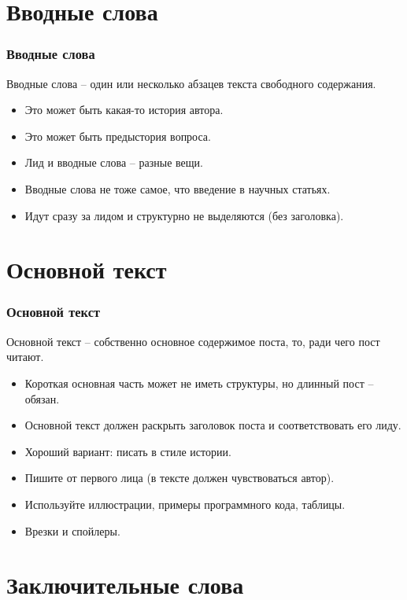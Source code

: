\documentclass[12pt]{beamer}
\begin{document}
\section{Вводные слова}

\begin{frame}
  \frametitle{Вводные слова}
  Вводные слова -- один или несколько абзацев текста свободного содержания.
  \begin{itemize}
  \item Это может быть какая-то история автора.
  \item Это может быть предыстория вопроса.
  \item Лид и вводные слова -- разные вещи.
  \item Вводные слова не тоже самое, что введение в научных статьях.
  \item Идут сразу за лидом и структурно не выделяются (без заголовка).
  \end{itemize}
\end{frame}

\section{Основной текст}

\begin{frame}
  \frametitle{Основной текст}
  Основной текст -- собственно основное содержимое поста, то, ради чего пост читают.
  \begin{itemize}
  \item Короткая основная часть может не иметь структуры, но длинный пост -- обязан.
  \item Основной текст должен раскрыть заголовок поста и соответствовать его лиду.
  \item Хороший вариант: писать в стиле истории.
  \item Пишите от первого лица (в тексте должен чувствоваться автор).
  \item Используйте иллюстрации, примеры программного кода, таблицы.
  \item Врезки и спойлеры.
  \end{itemize}
\end{frame}

\section{Заключительные слова}
\end{document}
